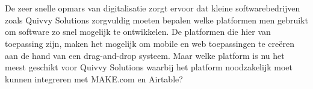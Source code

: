 
%
%
%
%
%

%



\chapter*{}

De zeer snelle opmars van digitalisatie zorgt ervoor dat kleine softwarebedrijven zoals Quivvy Solutions zorgvuldig 
moeten bepalen welke platformen men gebruikt om software zo snel mogelijk te ontwikkelen.
 De platformen die hier van toepassing zijn, maken het mogelijk om mobile en web toepassingen 
 te creëren aan de hand van een drag-and-drop systeem. Maar welke platform is nu het meest geschikt voor Quivvy Solutions waarbij het 
 platform noodzakelijk moet kunnen integreren met MAKE.com en Airtable?\\\\ 
 

